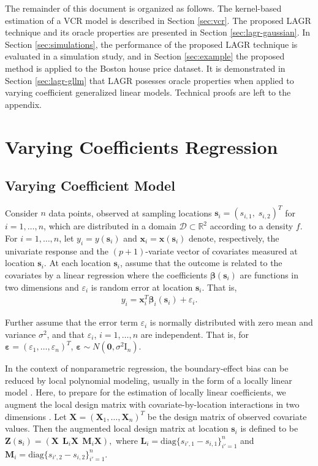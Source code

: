 \documentclass[authoryear,review, 12pt]{elsarticle}
\begin{document}
The remainder of this document is organized as follows. The kernel-based
estimation of a VCR model is described in Section \ref{sec:vcr}.
The proposed LAGR technique and its oracle properties are presented
in Section \ref{sec:lagr-gaussian}. In Section \ref{sec:simulations},
the performance of the proposed LAGR technique is evaluated in a simulation
study, and in Section \ref{sec:example} the proposed method is applied
to the Boston house price dataset. It is demonstrated in Section \ref{sec:lagr-gllm}
that LAGR posesses oracle properties when applied to varying coefficient
generalized linear models. Technical proofs are left to the appendix.


\section{Varying Coefficients Regression\label{sec:vcr}}


\subsection{Varying Coefficient Model}

Consider $n$ data points, observed at sampling locations $\bm{s}_{i}=(s_{i,1},\; s_{i,2})^{T}$
for $i=1,\dots,n$, which are distributed in a domain $\mathcal{D}\subset\mathbb{R}^{2}$
according to a density $f$. For $i=1,\dots,n$, let $y_{i}=y(\bm{s}_{i})$
and $\bm{x}_{i}=\bm{x}(\bm{s}_{i})$ denote, respectively, the univariate
response and the $(p+1)$-variate vector of covariates measured at
location $\bm{s}_{i}$. At each location $\bm{s}_{i}$, assume that
the outcome is related to the covariates by a linear regression where
the coefficients $\bm{\beta}(\bm{s}_{i})$ are functions in two dimensions
and $\varepsilon_{i}$ is random error at location $\bm{s}_{i}$.
That is, 
\begin{align}
y_{i}=\bm{x}_{i}^{T}\bm{\beta}_{i}(\bm{s}_{i})+\varepsilon_{i}.\label{eq:lm(s)}
\end{align}


Further assume that the error term $\varepsilon_{i}$ is normally
distributed with zero mean and variance $\sigma^{2}$, and that $\varepsilon_{i}$,
$i=1,\dots,n$ are independent. That is, for $\bm{\varepsilon}=\left(\varepsilon_{1},\dots,\varepsilon_{n}\right)^{T}$,
$\bm{\varepsilon}\sim N\left(\bm{0},\sigma^{2}\mathrm{I}_{n}\right)$. 

In the context of nonparametric regression, the boundary-effect bias
can be reduced by local polynomial modeling, usually in the form of
a locally linear model \citep{Fan-Gijbels-1996}. Here, to prepare
for the estimation of locally linear coefficients, we augment the
local design matrix with covariate-by-location interactions in two
dimensions \citep{Wang-2008b}. Let $\bm{X}=\left(\bm{X}_{1},\dots,\bm{X}_{n}\right)^{T}$
be the design matrix of observed covariate values. Then the augmented
local design matrix at location $\bm{s}_{i}$ is defined to be $\bm{Z}(\bm{s}_{i})=\left(\bm{X}\ \:\bm{L}_{i}\bm{X}\ \:\bm{M}_{i}\bm{X}\right),$
where $\bm{L}_{i}=\text{diag}\{s_{i',1}-s_{i,1}\}_{i'=1}^{n}$ and
$\bm{M}_{i}=\text{diag}\{s_{i',2}-s_{i,2}\}_{i'=1}^{n}$.
\end{document}
